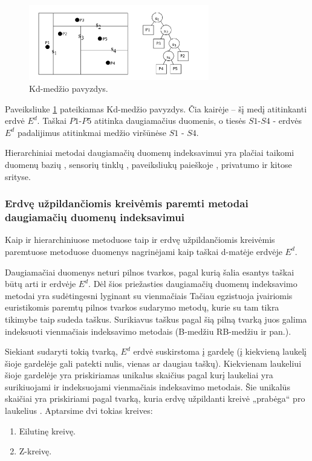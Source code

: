 \begin{figure}[H]
\begin{center}
\includegraphics[width=0.7\textwidth]{img/KdTreeExample.png}
\caption{Kd-medžio pavyzdys.}
\label{img:KdTreeExample}
\end{center}
\end{figure}

Paveiksliuke \ref{img:KdTreeExample} pateikiamas Kd-medžio pavyzdys.
Čia kairėje -- šį medį atitinkanti erdvė $E^d$.
Taškai $P1$-$P5$ atitinka daugiamačius duomenis, o tiesės $S1$-$S4$ - erdvės $E^d$ padalijimus atitinkmai medžio viršūnėse $S1$ - $S4$.

Hierarchiniai metodai daugiamačių duomenų indeksavimui yra plačiai taikomi duomenų bazių \cite{bohm2001searching}, sensorių tinklų \cite{li2003multi}, paveiksliukų paieškoje \cite{silpa2008optimised}, privatumo \cite{hore2012secure} \cite{xiao2010differentially} ir kitose srityse.

\subsubsection{Erdvę užpildančiomis kreivėmis paremti metodai daugiamačių duomenų indeksavimui}

Kaip ir hierarchiniuose metoduose taip ir erdvę užpildančiomis kreivėmis paremtuose metoduose duomenys nagrinėjami kaip taškai d-matėje erdvėje $E^d$.

Daugiamačiai duomenys neturi pilnos tvarkos, pagal kurią šalia esantys taškai būtų arti ir erdvėje $E^d$.
Dėl šios priežasties daugiamačių duomenų indeksavimo metodai yra sudėtingesni lyginant su vienmačiais \cite{gaede1998multidimensional} \cite{bohm2001searching}
Tačiau egzistuoja įvairiomis euristikomis paremtų pilnos tvarkos sudarymo metodų, kurie su tam tikra tikimybe taip sudeda taškus.
Surikiavus taškus pagal šią pilną tvarką juos galima indeksuoti vienmačiais indeksavimo metodais (B-medžiu \cite{comer1979ubiquitous} RB-medžiu \cite{hanke1997relaxed} ir pan.).

Siekiant sudaryti tokią tvarką, $E^d$ erdvė suskirstoma į gardelę (į kiekvieną laukelį šioje gardelėje gali patekti nulis, vienas ar daugiau taškų).
Kiekvienam laukeliui šioje gardelėje yra priskiriamas unikalus skaičius pagal kurį laukeliai yra surikiuojami ir indeksuojami vienmačiais indeksavimo metodais.
Šie unikalūs skaičiai yra priskiriami pagal tvarką, kuria erdvę užpildanti kreivė „prabėga“ pro laukelius \cite{bader2012space}.
Aptarsime dvi tokias kreives:
\begin{enumerate}
	\item Eilutinę kreivę.
	\item Z-kreivę.
\end{enumerate}


